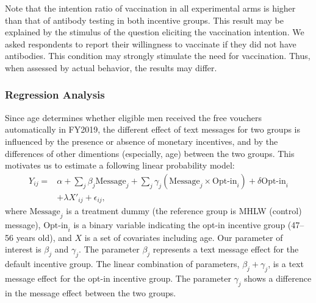 \documentclass[
]{article}
\begin{document}
Note that the intention ratio of vaccination in all experimental arms is higher than that of antibody testing in both incentive groups. This result may be explained by the stimulus of the question eliciting the vaccination intention. We asked respondents to report their willingness to vaccinate if they did not have antibodies. This condition may strongly stimulate the need for vaccination. Thus, when assessed by actual behavior, the results may differ.

\hypertarget{regression-analysis}{%
\subsubsection{Regression Analysis}\label{regression-analysis}}

Since age determines whether eligible men received the free vouchers automatically in FY2019, the different effect of text messages for two groups is influenced by the presence or absence of monetary incentives, and by the differences of other dimentions (especially, age) between the two groups. This motivates us to estimate a following linear probability model:
\begin{equation}
\begin{split}
Y_{ij} = &\alpha + \sum_j \beta_j \text{Message}_j + \sum_j \gamma_j (\text{Message}_j \times \text{Opt-in}_i) + \delta \text{Opt-in}_i \\
&+ \lambda X'_{ij} + \epsilon_{ij},
\end{split} \label{eq:regression}
\end{equation}
where \(\text{Message}_j\) is a treatment dummy (the reference group is MHLW (control) message), \(\text{Opt-in}_i\) is a binary variable indicating the opt-in incentive group (47--56 years old), and \(X\) is a set of covariates including age. Our parameter of interest is \(\beta_j\) and \(\gamma_j\). The parameter \(\beta_j\) represents a text message effect for the default incentive group. The linear combination of parameters, \(\beta_j + \gamma_j\), is a text message effect for the opt-in incentive group. The parameter \(\gamma_j\) shows a difference in the message effect between the two groups.
\end{document}
